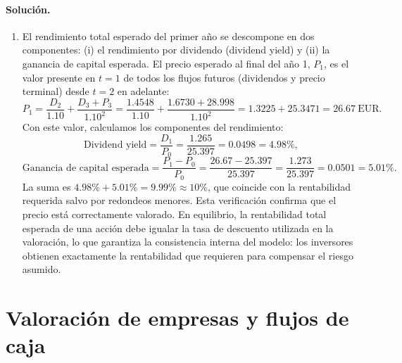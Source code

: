 \documentclass[12pt,a4paper]{article}
\newcommand{\EUR}[1]{\ensuremath{#1~\text{EUR}}}
\newenvironment{solucion}{\paragraph{Solución.}}{}
\begin{document}
\begin{solucion}
\begin{enumerate}[label=\alph*)]
  \item El rendimiento total esperado del primer año se descompone en dos componentes: (i) el rendimiento por dividendo (dividend yield) y (ii) la ganancia de capital esperada. El precio esperado al final del año 1, $P_1$, es el valor presente en $t=1$ de todos los flujos futuros (dividendos y precio terminal) desde $t=2$ en adelante:
  \[
  P_1 = \frac{D_2}{1.10} + \frac{D_3 + P_3}{1.10^2} = \frac{1.4548}{1.10} + \frac{1.6730 + 28.998}{1.10^2} = 1.3225 + 25.3471 = \EUR{26.67}.
  \]
  Con este valor, calculamos los componentes del rendimiento:
  \[
  \text{Dividend yield} = \frac{D_1}{P_0} = \frac{1.265}{25.397} = 0.0498 = 4.98\%,
  \]
  \[
  \text{Ganancia de capital esperada} = \frac{P_1 - P_0}{P_0} = \frac{26.67-25.397}{25.397} = \frac{1.273}{25.397} = 0.0501 = 5.01\%.
  \]
  La suma es $4.98\% + 5.01\% = 9.99\% \approx 10\%$, que coincide con la rentabilidad requerida salvo por redondeos menores. Esta verificación confirma que el precio está correctamente valorado. En equilibrio, la rentabilidad total esperada de una acción debe igualar la tasa de descuento utilizada en la valoración, lo que garantiza la consistencia interna del modelo: los inversores obtienen exactamente la rentabilidad que requieren para compensar el riesgo asumido.
\end{enumerate}
\end{solucion}

\section{Valoración de empresas y flujos de caja}
\end{document}
